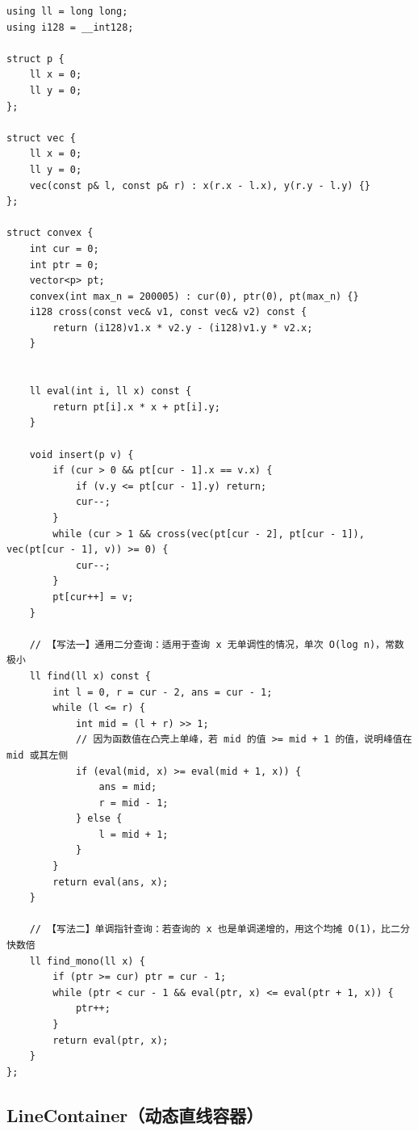 \begin{lstlisting}
using ll = long long;
using i128 = __int128;

struct p {
    ll x = 0;
    ll y = 0;
};

struct vec {
    ll x = 0;
    ll y = 0;
    vec(const p& l, const p& r) : x(r.x - l.x), y(r.y - l.y) {}
};

struct convex {
    int cur = 0;
    int ptr = 0; 
    vector<p> pt;
    convex(int max_n = 200005) : cur(0), ptr(0), pt(max_n) {}
    i128 cross(const vec& v1, const vec& v2) const {
        return (i128)v1.x * v2.y - (i128)v1.y * v2.x;
    }


    ll eval(int i, ll x) const {
        return pt[i].x * x + pt[i].y;
    }

    void insert(p v) {
        if (cur > 0 && pt[cur - 1].x == v.x) {
            if (v.y <= pt[cur - 1].y) return; 
            cur--;                        
        }
        while (cur > 1 && cross(vec(pt[cur - 2], pt[cur - 1]), vec(pt[cur - 1], v)) >= 0) {
            cur--;
        }
        pt[cur++] = v;
    }

    // 【写法一】通用二分查询：适用于查询 x 无单调性的情况，单次 O(log n)，常数极小
    ll find(ll x) const {
        int l = 0, r = cur - 2, ans = cur - 1;
        while (l <= r) {
            int mid = (l + r) >> 1;
            // 因为函数值在凸壳上单峰，若 mid 的值 >= mid + 1 的值，说明峰值在 mid 或其左侧
            if (eval(mid, x) >= eval(mid + 1, x)) {
                ans = mid;
                r = mid - 1;
            } else {
                l = mid + 1;
            }
        }
        return eval(ans, x);
    }

    // 【写法二】单调指针查询：若查询的 x 也是单调递增的，用这个均摊 O(1)，比二分快数倍
    ll find_mono(ll x) {
        if (ptr >= cur) ptr = cur - 1;
        while (ptr < cur - 1 && eval(ptr, x) <= eval(ptr + 1, x)) {
            ptr++;
        }
        return eval(ptr, x);
    }
};
\end{lstlisting}

\subsection{LineContainer（动态直线容器）}

